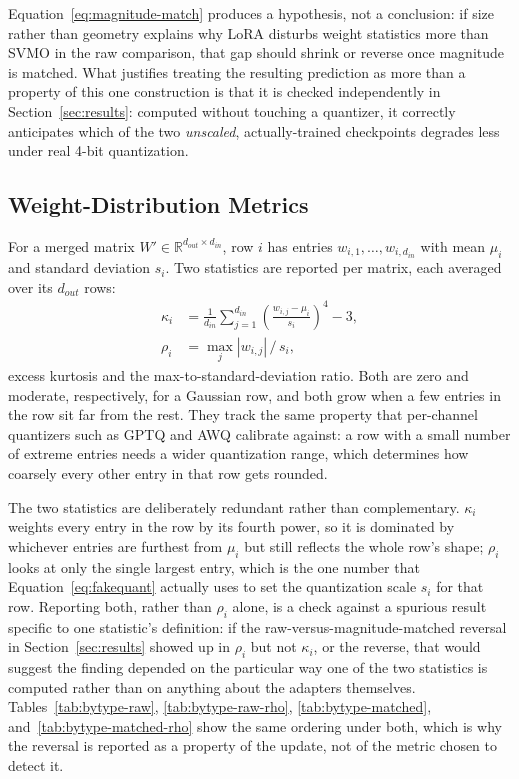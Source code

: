\documentclass[conference]{IEEEtran}
\begin{document}
Equation~\ref{eq:magnitude-match} produces a hypothesis, not a conclusion: if size rather than geometry explains why LoRA disturbs weight statistics more than SVMO in the raw comparison, that gap should shrink or reverse once magnitude is matched. What justifies treating the resulting prediction as more than a property of this one construction is that it is checked independently in Section~\ref{sec:results}: computed without touching a quantizer, it correctly anticipates which of the two \emph{unscaled}, actually-trained checkpoints degrades less under real 4-bit quantization.

\subsection{Weight-Distribution Metrics}

For a merged matrix $W' \in \mathbb{R}^{d_{out}\times d_{in}}$, row $i$ has entries $w_{i,1},\ldots,w_{i,d_{in}}$ with mean $\mu_i$ and standard deviation $s_i$. Two statistics are reported per matrix, each averaged over its $d_{out}$ rows:
\begin{align}
\kappa_i &= \frac{1}{d_{in}}\sum_{j=1}^{d_{in}} \left(\frac{w_{i,j}-\mu_i}{s_i}\right)^4 - 3, \\
\rho_i &= \max_j |w_{i,j}| \,/\, s_i,
\end{align}
excess kurtosis and the max-to-standard-deviation ratio. Both are zero and moderate, respectively, for a Gaussian row, and both grow when a few entries in the row sit far from the rest. They track the same property that per-channel quantizers such as GPTQ and AWQ calibrate against: a row with a small number of extreme entries needs a wider quantization range, which determines how coarsely every other entry in that row gets rounded.

The two statistics are deliberately redundant rather than complementary. $\kappa_i$ weights every entry in the row by its fourth power, so it is dominated by whichever entries are furthest from $\mu_i$ but still reflects the whole row's shape; $\rho_i$ looks at only the single largest entry, which is the one number that Equation~\ref{eq:fakequant} actually uses to set the quantization scale $s_i$ for that row. Reporting both, rather than $\rho_i$ alone, is a check against a spurious result specific to one statistic's definition: if the raw-versus-magnitude-matched reversal in Section~\ref{sec:results} showed up in $\rho_i$ but not $\kappa_i$, or the reverse, that would suggest the finding depended on the particular way one of the two statistics is computed rather than on anything about the adapters themselves. Tables~\ref{tab:bytype-raw}, \ref{tab:bytype-raw-rho}, \ref{tab:bytype-matched}, and~\ref{tab:bytype-matched-rho} show the same ordering under both, which is why the reversal is reported as a property of the update, not of the metric chosen to detect it.
\end{document}
